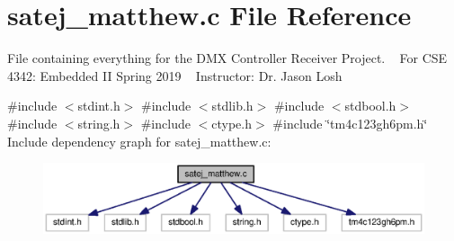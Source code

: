\section{satej\+\_\+matthew.\+c File Reference}
\label{satej__matthew_8c}


File containing everything for the D\+MX Controller Receiver Project. ~\newline
 For C\+SE 4342\+: Embedded II Spring 2019 ~\newline
 Instructor\+: Dr. Jason Losh~\newline
  


{\ttfamily \#include $<$stdint.\+h$>$}\newline
{\ttfamily \#include $<$stdlib.\+h$>$}\newline
{\ttfamily \#include $<$stdbool.\+h$>$}\newline
{\ttfamily \#include $<$string.\+h$>$}\newline
{\ttfamily \#include $<$ctype.\+h$>$}\newline
{\ttfamily \#include \char`\"{}tm4c123gh6pm.\+h\char`\"{}}\newline
Include dependency graph for satej\+\_\+matthew.\+c\+:
\nopagebreak
\begin{figure}[H]
\begin{center}
\leavevmode
\includegraphics[width=350pt]{satej__matthew_8c__incl}
\end{center}
\end{figure}
